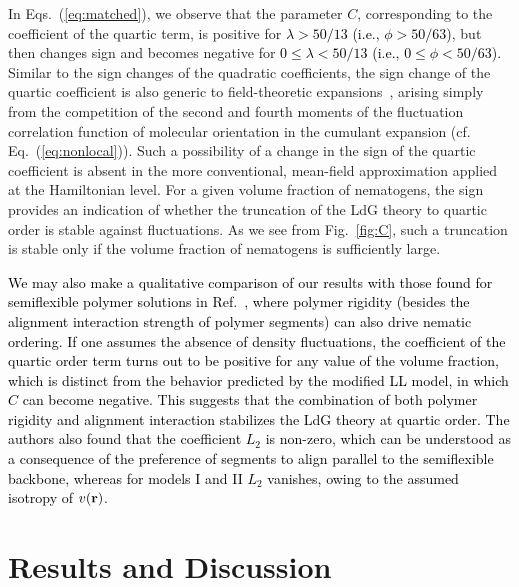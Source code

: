 \documentclass[jcp,aps,twocolumn,showpacs,supergroupedaddress,epsfig,amsmath,amssymb,eqsecnum]{revtex4}
\newcommand{\rv}{{\bf r}}
\newcommand{\bing}[1]{\textcolor{black}{#1}}
\begin{document}
In Eqs.~(\ref{eq:matched}), we observe that the parameter $C$, corresponding to the coefficient of the quartic term, is positive for \bing{$\lambda > 50/13$ (i.e., $\phi > 50/63$)}, but then changes sign and becomes negative for \bing{$0 \leq \lambda < 50/13$ (i.e., $0 \leq \phi < 50/63$).} Similar to the sign changes of the quadratic coefficients, the sign change of the quartic coefficient is also generic to field-theoretic expansions~\cite{altland-simons}, arising simply from the competition of the second and fourth moments of the fluctuation correlation function of molecular orientation in the cumulant expansion (cf. Eq.~(\ref{eq:nonlocal})). Such a possibility of a change in the sign of the quartic coefficient is absent in the more conventional, mean-field approximation applied at the Hamiltonian level. 
For a given volume fraction of nematogens, the sign provides an indication of whether the truncation of the LdG theory to quartic order is stable against  fluctuations. 
As we see from Fig.~\ref{fig:C}, such a truncation is stable only if the volume fraction of nematogens is sufficiently large. 

\bing{We may also make a qualitative comparison of our results with those found for semiflexible polymer solutions in Ref.~\cite{liu-fredrickson1993}, where polymer rigidity (besides the alignment interaction strength of polymer segments) can also drive nematic ordering. If one assumes the absence of density fluctuations, the coefficient of the quartic order term turns out to be positive for any value of the volume fraction, which is distinct from the behavior predicted by the modified LL model, in which $C$ can become negative. This suggests that the combination of both polymer rigidity and alignment interaction stabilizes the LdG theory at quartic order. The authors also found that the coefficient $L_2$ is non-zero, which can be understood as a consequence of the preference of segments to align parallel to the semiflexible backbone, whereas for models I and II $L_2$ vanishes, owing to the assumed isotropy of $v(\rv)$.}  

\section{Results and Discussion}
\end{document}
